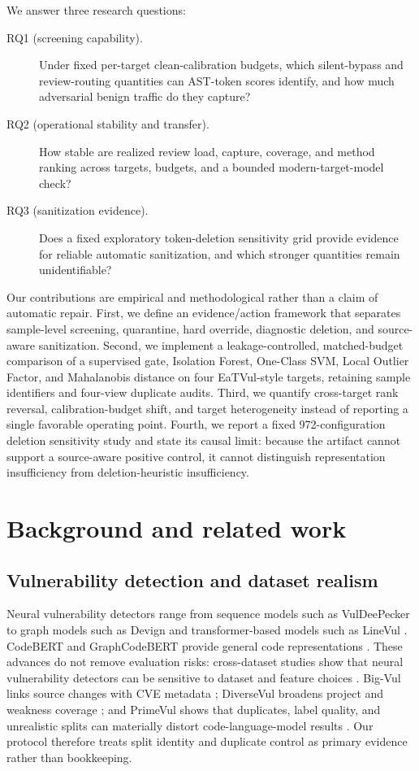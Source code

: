 \documentclass[a4paper,fleqn]{cas-dc}
\begin{document}
We answer three research questions:
\begin{description}
\item[RQ1 (screening capability).] Under fixed per-target clean-calibration budgets, which silent-bypass and review-routing quantities can AST-token scores identify, and how much adversarial benign traffic do they capture?
\item[RQ2 (operational stability and transfer).] How stable are realized review load, capture, coverage, and method ranking across targets, budgets, and a bounded modern-target-model check?
\item[RQ3 (sanitization evidence).] Does a fixed exploratory token-deletion sensitivity grid provide evidence for reliable automatic sanitization, and which stronger quantities remain unidentifiable?
\end{description}

Our contributions are empirical and methodological rather than a claim of automatic repair. First, we define an evidence/action framework that separates sample-level screening, quarantine, hard override, diagnostic deletion, and source-aware sanitization. Second, we implement a leakage-controlled, matched-budget comparison of a supervised gate, Isolation Forest, One-Class SVM, Local Outlier Factor, and Mahalanobis distance on four EaTVul-style targets, retaining sample identifiers and four-view duplicate audits. Third, we quantify cross-target rank reversal, calibration-budget shift, and target heterogeneity instead of reporting a single favorable operating point. Fourth, we report a fixed 972-configuration deletion sensitivity study and state its causal limit: because the artifact cannot support a source-aware positive control, it cannot distinguish representation insufficiency from deletion-heuristic insufficiency.

\section{Background and related work}\label{sec:related}

\subsection{Vulnerability detection and dataset realism}

Neural vulnerability detectors range from sequence models such as VulDeePecker \cite{li2018vuldeepecker} to graph models such as Devign \cite{zhou2019devign} and transformer-based models such as LineVul \cite{fu2022linevul}. CodeBERT and GraphCodeBERT provide general code representations \cite{feng2020codebert,guo2021graphcodebert}. These advances do not remove evaluation risks: cross-dataset studies show that neural vulnerability detectors can be sensitive to dataset and feature choices \cite{chakraborty2020arewe}. Big-Vul links source changes with CVE metadata \cite{fan2020bigvul}; DiverseVul broadens project and weakness coverage \cite{chen2023diversevul}; and PrimeVul shows that duplicates, label quality, and unrealistic splits can materially distort code-language-model results \cite{ding2024primevul}. Our protocol therefore treats split identity and duplicate control as primary evidence rather than bookkeeping.
\end{document}
